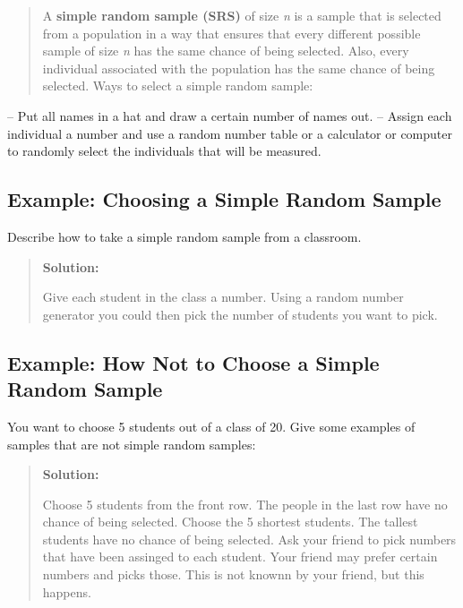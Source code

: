\documentclass[]{book}
\begin{document}
\begin{quote}
A \textbf{simple random sample (SRS)} of size \emph{n} is a sample that is selected from a population in a way that ensures that every different possible sample of size \emph{n} has the same chance of being selected. Also, every individual associated with the population has the same chance of being selected.
Ways to select a simple random sample:
\end{quote}

-- Put all names in a hat and draw a certain number of names out.
-- Assign each individual a number and use a random number table or a calculator or computer to randomly select the individuals that will be measured.

\hypertarget{example-choosing-a-simple-random-sample}{%
\subsection{Example: Choosing a Simple Random Sample}\label{example-choosing-a-simple-random-sample}}

Describe how to take a simple random sample from a classroom.

\begin{quote}
\textbf{Solution:}

Give each student in the class a number. Using a random number generator you could then pick the number of students you want to pick.
\end{quote}

\hypertarget{example-how-not-to-choose-a-simple-random-sample}{%
\subsection{Example: How Not to Choose a Simple Random Sample}\label{example-how-not-to-choose-a-simple-random-sample}}

You want to choose 5 students out of a class of 20. Give some examples of samples that are {not} simple random samples:

\begin{quote}
\textbf{Solution:}

Choose 5 students from the front row. The people in the last row have no chance of being selected.
Choose the 5 shortest students. The tallest students have no chance of being selected.
Ask your friend to pick numbers that have been assinged to each student. Your friend may prefer certain numbers and picks those. This is not knownn by your friend, but this happens.
\end{quote}
\end{document}
